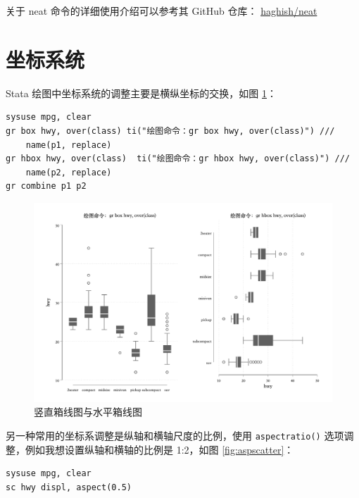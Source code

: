 关于 neat 命令的详细使用介绍可以参考其 GitHub 仓库： \href{https://github.com/haghish/neat}{haghish/neat}

\section{坐标系统}

Stata 绘图中坐标系统的调整主要是横纵坐标的交换，如图 \ref{fig:boxcombine}：

\begin{lstlisting}
sysuse mpg, clear
gr box hwy, over(class) ti("绘图命令：gr box hwy, over(class)") ///
    name(p1, replace)
gr hbox hwy, over(class)  ti("绘图命令：gr hbox hwy, over(class)") ///
    name(p2, replace)
gr combine p1 p2
\end{lstlisting}

\begin{figure}[htbp]
  \centering \includegraphics[width=\textwidth]{assets/boxcombine.png}
  \caption{竖直箱线图与水平箱线图}\label{fig:boxcombine}
\end{figure}

另一种常用的坐标系调整是纵轴和横轴尺度的比例，使用 \texttt{aspectratio()} 选项调整，例如我想设置纵轴和横轴的比例是 1:2，如图 \ref{fig:aspscatter}：

\begin{lstlisting}
sysuse mpg, clear
sc hwy displ, aspect(0.5)
\end{lstlisting}

